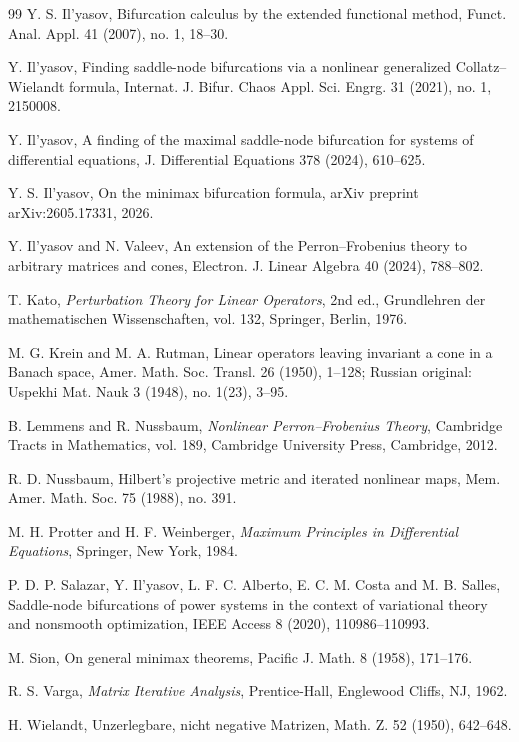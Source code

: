 \documentclass[preprint,10pt]{elsarticle}
\theoremstyle{plain}
\theoremstyle{definition}
\theoremstyle{remark}
\begin{document}
\begin{thebibliography}{99}
	Y. S. Il'yasov,
	Bifurcation calculus by the extended functional method,
	Funct. Anal. Appl. 41 (2007), no. 1, 18--30.
	
	Y. Il'yasov,
	Finding saddle-node bifurcations via a nonlinear generalized
	Collatz--Wielandt formula,
	Internat. J. Bifur. Chaos Appl. Sci. Engrg. 31 (2021), no. 1, 2150008.
	
	Y. Il'yasov,
	A finding of the maximal saddle-node bifurcation for systems of differential
	equations,
	J. Differential Equations 378 (2024), 610--625.
	
	Y. S. Il'yasov,
	On the minimax bifurcation formula,
	arXiv preprint arXiv:2605.17331, 2026.
	
	Y. Il'yasov and N. Valeev,
	An extension of the Perron--Frobenius theory to arbitrary matrices and cones,
	Electron. J. Linear Algebra 40 (2024), 788--802.
	
	T. Kato,
	\textit{Perturbation Theory for Linear Operators},
	2nd ed.,
	Grundlehren der mathematischen Wissenschaften, vol. 132,
	Springer, Berlin, 1976.
	
	M. G. Krein and M. A. Rutman,
	Linear operators leaving invariant a cone in a Banach space,
	Amer. Math. Soc. Transl. 26 (1950), 1--128;
	Russian original: Uspekhi Mat. Nauk 3 (1948), no. 1(23), 3--95.
	
	B. Lemmens and R. Nussbaum,
	\textit{Nonlinear Perron--Frobenius Theory},
	Cambridge Tracts in Mathematics, vol. 189,
	Cambridge University Press, Cambridge, 2012.
	
	R. D. Nussbaum,
	Hilbert's projective metric and iterated nonlinear maps,
	Mem. Amer. Math. Soc. 75 (1988), no. 391.
	
	M. H. Protter and H. F. Weinberger,
	\textit{Maximum Principles in Differential Equations},
	Springer, New York, 1984.
	
	P. D. P. Salazar, Y. Il'yasov, L. F. C. Alberto, E. C. M. Costa and M. B. Salles,
	Saddle-node bifurcations of power systems in the context of variational theory
	and nonsmooth optimization,
	IEEE Access 8 (2020), 110986--110993.
	
	M. Sion,
	On general minimax theorems,
	Pacific J. Math. 8 (1958), 171--176.
	
	R. S. Varga,
	\textit{Matrix Iterative Analysis},
	Prentice-Hall, Englewood Cliffs, NJ, 1962.
	
	H. Wielandt,
	Unzerlegbare, nicht negative Matrizen,
	Math. Z. 52 (1950), 642--648.
	
\end{thebibliography}
\end{document}

